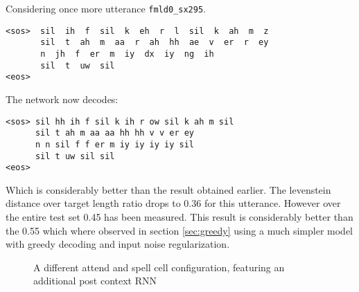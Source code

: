 \newpage
Considering once more utterance \texttt{fmld0\_sx295}.
\begin{lstlisting}[caption={Targets}]
<sos>  sil  ih  f  sil  k  eh  r  l  sil  k  ah  m  z
       sil  t  ah  m  aa  r  ah  hh  ae  v  er  r  ey
       n  jh  f  er  m  iy  dx  iy  ng  ih  
       sil  t  uw  sil
<eos>
\end{lstlisting}
The network now decodes:
\begin{lstlisting}[caption={Network output}]
<sos> sil hh ih f sil k ih r ow sil k ah m sil 
      sil t ah m aa aa hh hh v v er ey 
      n n sil f f er m iy iy iy iy sil
      sil t uw sil sil
<eos>
\end{lstlisting}
Which is considerably better than the result obtained earlier. The levenstein distance over target length ratio drops to 0.36 for this utterance. However over the entire test set 0.45 has been measured. This result is considerably better than the 0.55 which where observed in section \ref{sec:greedy} using a much simpler model with greedy decoding and input noise regularization.  

\begin{figure}
\centering

\caption{A different attend and spell cell configuration, featuring an additional post context RNN}
\label{fig:lasVariants}
\end{figure}
